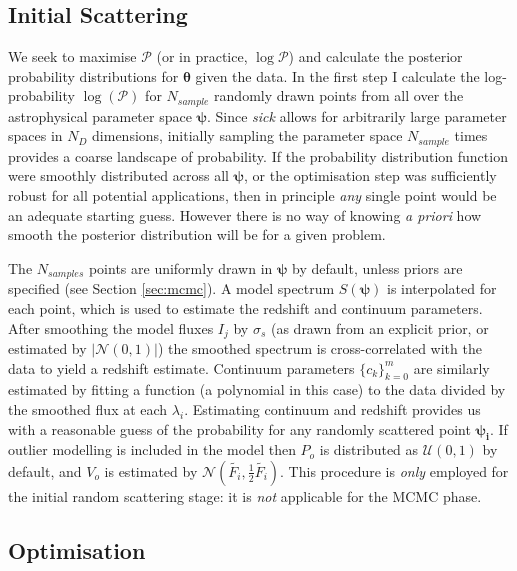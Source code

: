 \documentclass{aastex}
\newcommand{\sick}{\textit{sick}}
\begin{document}
\subsection{Initial Scattering}
\label{sec:scattering}

We seek to maximise $\mathcal{P}$ (or in practice, $\log\mathcal{P}$) and calculate
the posterior probability distributions for $\bm{\theta}$ given the data. In the 
first step I calculate the log-probability $\log{(\mathcal{P})}$ for $N_{sample}$ 
randomly drawn points from all over the astrophysical parameter space $\bm{\psi}$. 
Since \sick{} allows for arbitrarily large parameter spaces in $N_{D}$ dimensions, 
initially sampling the parameter space $N_{sample}$ times provides a coarse 
landscape of probability. If the probability distribution function were smoothly 
distributed across all $\bm{\psi}$, or the optimisation step was sufficiently 
robust for all potential applications, then in principle \textit{any} single 
point would be an adequate starting guess. However there is no way of knowing 
\textit{a priori} how smooth the posterior distribution will be for a given problem. 

The $N_{samples}$ points are uniformly drawn in $\bm{\psi}$ by default, unless 
priors are specified (see Section \ref{sec:mcmc}). A model spectrum $S(\bm{\psi})$ 
is interpolated for each point, which is used to estimate the redshift and continuum 
parameters. After smoothing the model fluxes $I_j$ by $\sigma_s$ (as drawn from an 
explicit prior, or estimated by $\left|\mathcal{N}\left(0, 1\right)\right|$) the 
smoothed spectrum is cross-correlated with the data to yield a redshift estimate. 
Continuum parameters $\{c_k\}_{k=0}^{m}$ are similarly estimated by fitting a 
function (a polynomial in this case) to the data divided by the smoothed flux at 
each $\lambda_i$. Estimating continuum and redshift provides us with a reasonable 
guess of the probability for any randomly scattered point $\bm{\psi_i}$. If outlier 
modelling is included in the model then $P_o$ is distributed as 
$\mathcal{U}\left(0, 1\right)$ by default, and $V_o$ is estimated by 
$\mathcal{N}\left(\widetilde{F_i}, \frac{1}{2}\widetilde{F_i}\right)$. This procedure 
is \textit{only} employed for the initial random scattering stage: it is 
\textit{not} applicable for the MCMC phase. 

\subsection{Optimisation}
\label{sec:optimise}
\end{document}
